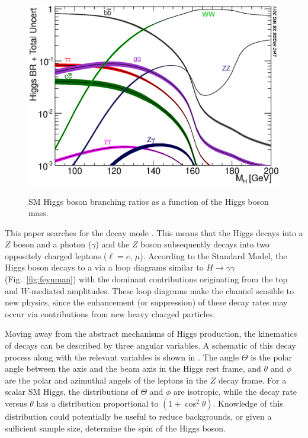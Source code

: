 \begin{figure}[!htbp]
  \begin{center}
  {\includegraphics[scale=0.5, angle=0]{figures/YRHXS2_BR_Fig1}}
  \caption{SM Higgs boson branching ratios as a function of the Higgs boson mass.}
  \label{fig:higgsbrs}
  \end{center}
\end{figure}

This paper searches for the decay mode \HTollg. This means that the Higgs
decays into a $Z$ boson and a photon ($\gamma$) and the $Z$ boson subsequently 
decays into
two oppositely charged leptons ($\ell = e$, $\mu$). According to the Standard
Model, the Higgs boson decays to a \Zgamma via a loop diagrams similar to 
$H \to \gamma\gamma$ (Fig.~\ref{fig:feynman}) with the dominant contributions 
originating from the top and $W$-mediated amplitudes. These loop diagrams make the
\HToZg channel sensible to new physics, since the enhancement (or suppression)
of these decay rates may occur via contributions from new heavy charged particles.

Moving away from the abstract mechanisms of Higgs production, the kinematics
of \HTollg decays can be described by three angular variables. A schematic
of this decay process along with the relevant variables is shown in .
The angle $\Theta$ is the polar angle between the \Zgamma axis and the beam axis
in the  Higgs rest frame, and
$\theta$ and $\phi$ are the polar and azimuthal angels of the leptons in the
$Z$ decay frame. For a scalar SM Higgs, the distributions of $\Theta$ and
$\phi$ are isotropic, while the decay rate versus $\theta$ has
a distribution proportional to $(1 + \cos^2{\theta})$. Knowledge of this 
distribution could potentially be useful to reduce backgrounds, or given
a sufficient sample size, determine the spin of the Higgs boson.

